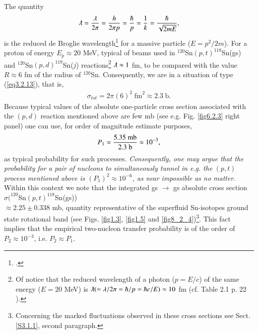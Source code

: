 The quantity
\begin{align}\label{eq3.2.16}
\lambdabar=\frac{\lambda}{2\pi}=\frac{h}{2\pi p}=\frac{\hbar}{p}=\frac{1}{k}=\frac{\hbar}{\sqrt{2mE}},
\end{align}
is the reduced de Broglie wavelength\footnote{\cite{Broglie:25}.} for a massive particle ($E=p^2/2m$). For a proton of energy $E_p\approx 20$ MeV, typical of beams used in $^{120}$Sn$(p,t)^{118}$Sn(gs) and $^{120}$Sn$(p,d)^{119}$Sn($j$) reactions\footnote{Of notice that the reduced wavelength of a photon ($p=E/c$) of the same energy ($E= 20$ MeV) is $\lambdabar (=\lambda/2\pi=\hbar/p=\hbar c/E)\approx 10$ fm (cf. Table 2.1 p. 22 \cite{Satchler:80}).} $\lambdabar\approx 1$ fm, to be compared with the value $R\approx 6$ fm of the radius of $^{120}$Sn. Consequently, we are in a situation of type (\ref{eq3.2.13}), that is,
\begin{align}
\sigma_{tot}=2\pi(6)^2\;\text{fm}^2\approx 2.3\;\text{b}.
\end{align}
Because typical values of the absolute one-particle cross section associated  with the $(p,d)$ reaction mentioned above are few mb (see e.g. Fig. \ref{fig6.2.3} right panel) one can use, for order of magnitude estimate purposes,  
\begin{align}
P_1\approx\frac{5.35\; \text{mb}}{2.3\;\text{b}}\approx 10^{-3}, \idx{Two-nucleon transfer!one- and two-particle transfer probabilities}
\end{align}
as  typical probability for such processes. \textit{Consequently, one may argue that the probability for a  pair of nucleons to simultaneously tunnel in e.g. the $(p,t)$ process mentioned above is $(P_1)^2\approx10^{-6}$, as near impossible as no matter}. Within this context we note that the integrated gs $\rightarrow$ gs absolute cross section $\sigma(^{120}$Sn$(p,t)^{118}$Sn(gs))\\$\approx 2.25 \pm$0.338 mb, quantity representative of the superfluid Sn-isotopes ground state rotational band (see Figs. \ref{fig1.3}, \ref{fig1.5} and \ref{fig8_2_4})\footnote{Concerning the marked fluctuations observed in these cross sections see Sect. \ref{S3.1.1}, second paragraph.}. This fact implies that the empirical two-nucleon transfer probability is of the order of $P_2\approx 10^{-3}$, i.e. $P_2\approx P_1$. 




